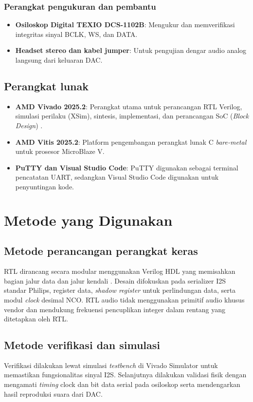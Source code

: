 \subsubsection{Perangkat pengukuran dan pembantu}
\begin{itemize}
    \item \textbf{Osiloskop Digital TEXIO DCS-1102B}: Mengukur dan memverifikasi integritas sinyal BCLK, WS, dan DATA.
    \item \textbf{Headset stereo dan kabel jumper}: Untuk pengujian dengar audio analog langsung dari keluaran DAC.
\end{itemize}

\subsection{Perangkat lunak}
\begin{itemize}
    \item \textbf{AMD Vivado 2025.2}: Perangkat utama untuk perancangan RTL Verilog, simulasi perilaku (XSim), sintesis, implementasi, dan perancangan SoC (\textit{Block Design}) \citep{xilinx_vivado_ip_subsystems_2025}.
    \item \textbf{AMD Vitis 2025.2}: Platform pengembangan perangkat lunak C \textit{bare-metal} untuk prosesor MicroBlaze V.
    \item \textbf{PuTTY dan Visual Studio Code}: PuTTY digunakan sebagai terminal pencatatan UART, sedangkan Visual Studio Code digunakan untuk penyuntingan kode.
\end{itemize}

\section{Metode yang Digunakan}

\subsection{Metode perancangan perangkat keras}
RTL dirancang secara modular menggunakan Verilog HDL yang memisahkan bagian jalur data dan jalur kendali \citep{palnitkar_verilog_2003}. Desain difokuskan pada serializer I2S standar Philips, register data, \textit{shadow register} untuk perlindungan data, serta modul \textit{clock} desimal NCO. RTL audio tidak menggunakan primitif audio khusus vendor dan mendukung frekuensi pencuplikan integer dalam rentang yang ditetapkan oleh RTL.

\subsection{Metode verifikasi dan simulasi}
Verifikasi dilakukan lewat simulasi \textit{testbench} di Vivado Simulator untuk memastikan fungsionalitas sinyal I2S. Selanjutnya dilakukan validasi fisik dengan mengamati \textit{timing} clock dan bit data serial pada osiloskop serta mendengarkan hasil reproduksi suara dari DAC.

